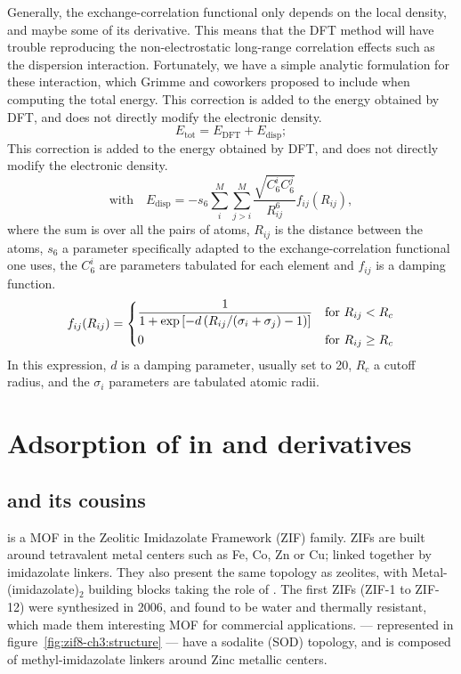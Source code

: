 \documentclass[thesis]{subfiles}
\begin{document}
Generally, the exchange-correlation functional only depends on the local
density, and maybe some of its derivative. This means that the DFT method will
have trouble reproducing the non-electrostatic long-range correlation effects
such as the dispersion interaction. Fortunately, we have a simple analytic
formulation for these interaction, which Grimme and coworkers\cite{Grimme2006}
proposed to include when computing the total energy. This correction is added to
the energy obtained by DFT, and does not directly modify the electronic density.
\[E_\text{tot} = E_\text{DFT} + E_\text{disp}; \]
This correction is added to the energy obtained by DFT, and does not directly
modify the electronic density.
\[\text{with}\quad E_\text{disp} = - s_6 \sum_i^M\sum_{j>i}^M\frac{\sqrt{C_6^i C_6^j}}{R_{ij}^6} f_{ij}(R_{ij}),\]
where the sum is over all the pairs of atoms, $R_{ij}$ is the distance between
the atoms, $s_6$ a parameter specifically adapted to the exchange-correlation
functional one uses, the $C_6^i$ are parameters tabulated for each element and
$f_{ij}$ is a damping function.
\[f_{ij}(R_{ij}) =
\begin{dcases}
    \frac{1}{1 + \exp\left[-d \left(R_{ij} / (\sigma_i + \sigma_j) -1\right)\right]} &\text{for } R_{ij} < R_c \\
    0 &\text{for } R_{ij} \geq R_c \\
\end{dcases}\]
In this expression, $d$ is a damping parameter, usually set to 20, $R_c$ a
cutoff radius, and the $\sigma_i$ parameters are tabulated atomic \vdW radii.

\clearpage
\section{Adsorption of  in  and derivatives}

\subsection{ and its cousins}

 is a MOF in the Zeolitic Imidazolate Framework (ZIF) family. ZIFs are
built around tetravalent metal centers such as Fe, Co, Zn or Cu; linked together
by imidazolate linkers. They also present the same topology as zeolites, with
Metal-(imidazolate)$_2$ building blocks taking the role of . The first
ZIFs (ZIF-1 to ZIF-12) were synthesized in 2006\cite{Park2006}, and found to be
water and thermally resistant, which made them interesting MOF for commercial
applications.  --- represented in figure~\ref{fig:zif8-ch3:structure} ---
have a sodalite (SOD) topology, and is composed of methyl-imidazolate linkers
around Zinc metallic centers.
\end{document}
